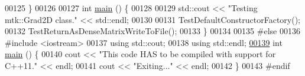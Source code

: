 \begin{DoxyCode}
00125 \}
00126 
00127 \textcolor{keywordtype}{int} \hyperlink{mtk__grad__2d__test_8cc_ae66f6b31b5ad750f1fe042a706a4e3d4}{main} () \{
00128 
00129   std::cout << \textcolor{stringliteral}{"Testing mtk::Grad2D class."} << std::endl;
00130 
00131   TestDefaultConstructorFactory();
00132   TestReturnAsDenseMatrixWriteToFile();
00133 \}
00134 
00135 \textcolor{preprocessor}{#else}
00136 \textcolor{preprocessor}{#include <iostream>}
00137 \textcolor{keyword}{using} std::cout;
00138 \textcolor{keyword}{using} std::endl;
\hypertarget{mtk__grad__2d__test_8cc_source_l00139}{}\hyperlink{mtk__grad__2d__test_8cc_ae66f6b31b5ad750f1fe042a706a4e3d4}{00139} \textcolor{keywordtype}{int} \hyperlink{mtk__grad__2d__test_8cc_ae66f6b31b5ad750f1fe042a706a4e3d4}{main} () \{
00140   cout << \textcolor{stringliteral}{"This code HAS to be compiled with support for C++11."} << endl;
00141   cout << \textcolor{stringliteral}{"Exiting..."} << endl;
00142 \}
00143 \textcolor{preprocessor}{#endif}
\end{DoxyCode}
